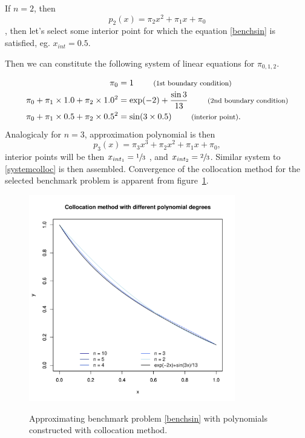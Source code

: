 If $n=2$, then 
\begin{equation}p_{2}(x) = \pi_{2}x^{2} +\pi_{1}x + \pi_{0}\end{equation},
then let's select some interior point for which the equation 
\eqref{benchsin} is 
satisfied, eg. $x_{int}=0.5$.

Then we can constitute the following system of linear equations for 
$\pi_{0,1,2}$.

\begin{equation}
 \label{systemcolloc} 
 \begin{split}
  \pi_{0} &= 1 \qquad \mbox{ \footnotesize(1st boundary condition)} \\
  \pi_{0} + \pi_{1} \times 1.0 + \pi_{2} \times 1.0^{2} &=  \exp(-2) + 
  \frac{\sin 3}{13} \qquad  \mbox{ \footnotesize(2nd boundary condition)} \\
  \pi_{0} + \pi_{1}\times 0.5 + \pi_{2} \times 0.5^{2} &= \sin (3 
  \times 0.5) \qquad \mbox{ \footnotesize(interior point)}.
 \end{split} 
\end{equation}
Analogicaly for $n=3$, approximation polynomial is then
\begin{equation}p_{3}(x) = \pi_{3}x^{3} + \pi_{2}x^{2} +\pi_{1}x + 
\pi_{0},\end{equation} interior points will be then
$x_{int_{1}}=\sfrac{1}{3}$ , and $x_{int_{2}}=\sfrac{2}{3}$. Similar 
system to \eqref{systemcolloc} is then assembled. Convergence of the 
collocation method for the selected benchmark problem is apparent from 
figure~\ref{collocconv}.
\begin{figure}
\centering
 \includegraphics[width=9cm]{images1/collocation_adv_numerics.pdf}
 \label{collocconv}
 \caption{Approximating benchmark problem \eqref{benchsin} with 
 polynomials constructed with collocation method.}
\end{figure}

